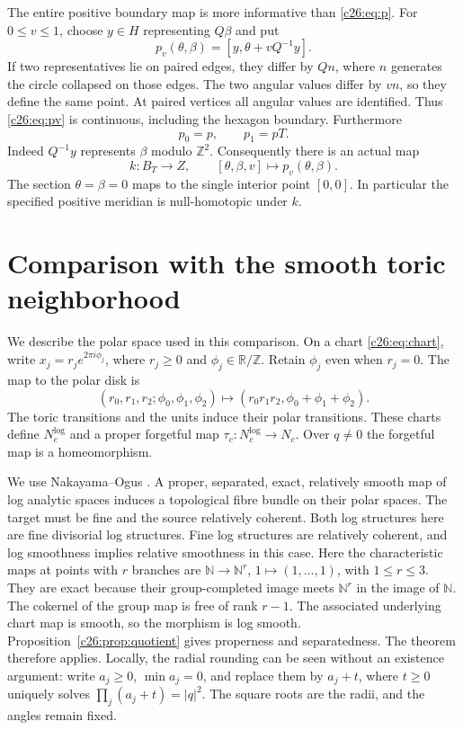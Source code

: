 The entire positive boundary map is more informative than \eqref{c26:eq:p}.
For $0\le v\le1$, choose $y\in H$ representing $Q\beta$ and put
\begin{equation}\label{c26:eq:pv}
p_v(\theta,\beta)=[y,\theta+vQ^{-1}y].
\end{equation}
If two representatives lie on paired edges, they differ by $Qn$,
where $n$ generates the circle collapsed on those edges.
The two angular values differ by $vn$, so they define the same point.
At paired vertices all angular values are identified.
Thus \eqref{c26:eq:pv} is continuous, including the hexagon boundary.
Furthermore
\begin{equation}\label{c26:eq:endpoints}
p_0=p,\qquad p_1=pT.
\end{equation}
Indeed $Q^{-1}y$ represents $\beta$ modulo $\mathbb Z^2$.
Consequently there is an actual map
\begin{equation}\label{c26:eq:k}
k:B_T\longrightarrow Z,\qquad [\theta,\beta,v]\longmapsto p_v(\theta,\beta).
\end{equation}
The section $\theta=\beta=0$ maps to the single interior point $[0,0]$.
In particular the specified positive meridian is null-homotopic under $k$.

\section{Comparison with the smooth toric neighborhood}

We describe the polar space used in this comparison.
On a chart \eqref{c26:eq:chart}, write
$x_j=r_je^{2\pi i\phi_j}$, where $r_j\ge0$ and
$\phi_j\in\mathbb R/\mathbb Z$. Retain $\phi_j$ even when $r_j=0$.
The map to the polar disk is
\[
(r_0,r_1,r_2;\phi_0,\phi_1,\phi_2)
\longmapsto(r_0r_1r_2,\phi_0+\phi_1+\phi_2).
\]
The toric transitions and the units induce their polar transitions.
These charts define $N_c^{\log}$ and a proper forgetful map
$\tau_c:N_c^{\log}\to N_c$.
Over $q\ne0$ the forgetful map is a homeomorphism.

We use Nakayama--Ogus \cite[Theorem 5.1]{CuspNO}.
A proper, separated, exact, relatively smooth map of log analytic
spaces induces a topological fibre bundle on their polar spaces.
The target must be fine and the source relatively coherent.
Both log structures here are fine divisorial log structures.
Fine log structures are relatively coherent, and log smoothness
implies relative smoothness in this case.
Here the characteristic maps at points with $r$ branches are
$\mathbb N\to\mathbb N^r$, $1\mapsto(1,\ldots,1)$, with $1\le r\le3$.
They are exact because their group-completed image meets
$\mathbb N^r$ in the image of $\mathbb N$.
The cokernel of the group map is free of rank $r-1$.
The associated underlying chart map is smooth, so the morphism is log smooth.
Proposition~\ref{c26:prop:quotient}
gives properness and separatedness. The theorem therefore applies.
Locally, the radial rounding can be seen without an existence argument:
write $a_j\ge0$, $\min a_j=0$, and replace them by $a_j+t$,
where $t\ge0$ uniquely solves $\prod_j(a_j+t)=|q|^2$.
The square roots are the radii, and the angles remain fixed.

